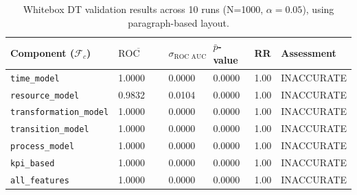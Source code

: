 \begin{table}[htbp]
  \centering
  \caption{Whitebox DT validation results across 10 runs (N=1000, $\alpha=0.05$), using paragraph-based layout.}
  \label{tab:results-whitebox}
  \begin{tabular}{l l l l l p{3cm}}
    \toprule
    \textbf{Component ($\mathcal{F}_c$)} & \textbf{$\overline{\text{ROC AUC}}$} & \textbf{$\sigma_{\text{ROC AUC}}$} & \textbf{$\bar{p}$-value} & \textbf{RR} & \textbf{Assessment} \\
    \midrule
    \texttt{time\_model}                 & 1.0000                               & 0.0000                             & 0.0000                   & 1.00        & INACCURATE          \\
    \texttt{resource\_model}             & 0.9832                               & 0.0104                             & 0.0000                   & 1.00        & INACCURATE          \\
    \texttt{transformation\_model}       & 1.0000                               & 0.0000                             & 0.0000                   & 1.00        & INACCURATE          \\
    \texttt{transition\_model}           & 1.0000                               & 0.0000                             & 0.0000                   & 1.00        & INACCURATE          \\
    \texttt{process\_model}              & 1.0000                               & 0.0000                             & 0.0000                   & 1.00        & INACCURATE          \\
    \texttt{kpi\_based}                  & 1.0000                               & 0.0000                             & 0.0000                   & 1.00        & INACCURATE          \\
    \texttt{all\_features}               & 1.0000                               & 0.0000                             & 0.0000                   & 1.00        & INACCURATE          \\
    \bottomrule
  \end{tabular}
\end{table}


